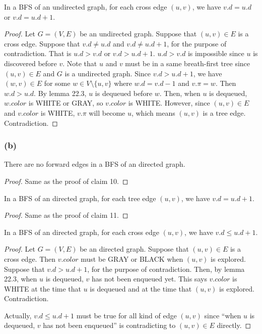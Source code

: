 \begin{claim}
    In a BFS of an undirected graph,
    for each cross edge $(u,v)$, we have $v.d=u.d$ or $v.d=u.d+1$.
\end{claim}

\begin{proof}
    Let $G = (V,E)$ be an undirected graph.
    Suppose that $(u,v) \in E$ is a cross edge.
    Suppose that $v.d \neq u.d$ and $v.d \neq u.d+1$,
    for the purpose of contradiction.
    That is $u.d > v.d$ or $v.d > u.d +1$.
    $u.d > v.d$ is impossible since $u$ is discovered before $v$.
    Note that $u$ and $v$ must be in a same breath-first tree
    since $(u,v) \in E$ and $G$ is a undirected graph.
    Since $v.d > u.d + 1$, we have $(w,v) \in E$ 
    for some $w \in V \setminus \{ u, v \}$
    where $w.d = v.d - 1$ and $v.\pi = w$.
    Then $w.d > u.d$.
    By lemma 22.3, $u$ is dequeued before $w$.
    Then, when $u$ is dequeued,
    $w.color$ is WHITE or GRAY,
    so $v.color$ is WHITE.
    However, since $(u,v) \in E$ and $v.color$ is WHITE,
    $v.\pi$ will become $u$,
    which means $(u,v)$ is a tree edge.
    Contradiction.
\end{proof}

\subsubsection*{(b)}

\begin{claim}
    There are no forward edges in a BFS of an directed graph.
\end{claim}

\begin{proof}
    Same as the proof of claim 10.
\end{proof}

\begin{claim}
    In a BFS of an directed graph,
    for each tree edge $(u,v)$, we have $v.d=u.d+1$.
\end{claim}

\begin{proof}
    Same as the proof of claim 11.
\end{proof}

\begin{claim}
    In a BFS of an directed graph,
    for each cross edge $(u,v)$, we have $v.d \leq u.d+1$.
\end{claim}

\begin{proof}
    Let $G = (V,E)$ be an directed graph.
    Suppose that $(u,v) \in E$ is a cross edge.
    Then $v.color$ must be GRAY or BLACK when $(u,v)$ is explored.
    Suppose that $v.d > u.d+1$,
    for the purpose of contradiction.
    Then, by lemma 22.3, 
    when $u$ is dequeued, $v$ has not been enqueued yet.
    This says $v.color$ is WHITE at the time that $u$ is dequeued
    and at the time that $(u,v)$ is explored.
    Contradiction.

    Actually, $v.d \leq u.d+1$ must be true for all kind of edge $(u,v)$
    since ``when $u$ is dequeued, $v$ has not been enqueued''
    is contradicting to $(u,v) \in E$ directly.
\end{proof}

